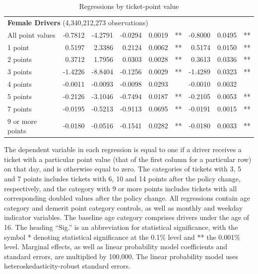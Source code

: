 \documentclass{cje}
\begin{document}
\begin{table}
\begin{tabular}{l r r r r l r r l}
\hline 

\multicolumn{8}{l}{\textbf{Female Drivers} (4,340,212,273 observations)} \\ 

All point values                &  -0.7812        &  -4.2791       &  -0.0294        &  0.0019       &   **       &  -0.8000        &  0.0495       &   **       \\ 
1 point                         &  0.5197        &  2.3386       &  0.2124        &  0.0062       &   **       &  0.5174        &  0.0150       &   **       \\ 
2 points                        &  0.3712        &  1.7956       &  0.0303        &  0.0028       &   **       &  0.3613        &  0.0336       &   **       \\ 
3 points                        &  -1.4226        &  -8.8404       &  -0.1256        &  0.0029       &   **       &  -1.4289        &  0.0323       &   **       \\ 
4 points                        &  -0.0011        &  -0.0093       &  -0.0098        &  0.0293       &            &  -0.0010        &  0.0032       &            \\ 
5 points                        &  -0.2126        &  -3.1046       &  -0.7494        &  0.0187       &   **       &  -0.2105        &  0.0053       &   **       \\ 
7 points                        &  -0.0195        &  -0.5213       &  -0.9113        &  0.0695       &   **       &  -0.0191        &  0.0015       &   **       \\ 
9 or more points                &  -0.0180        &  -0.0516       &  -0.1541        &  0.0282       &   **       &  -0.0180        &  0.0033       &   **       \\ 

\hline 

\end{tabular} 
\caption{Regressions by ticket-point value} 
The dependent variable in each regression is equal to one  
if a driver receives a ticket with a particular point value   
(that of the first column for a particular row) on that day,  
and is otherwise equal to zero. 
The categories of tickets with 3, 5 and 7 points includes tickets  
with 6, 10 and 14 points after the policy change, respectively,  
and the category with 9 or more points includes tickets  
with all corresponding doubled values after the policy change. 
All regressions contain age category and demerit point category controls, 
as well as monthly and weekday indicator variables. 
The baseline age category comprises drivers under the age of 16. 
The heading ``Sig.'' is an abbreviation for statistical significance, with 
the symbol * denoting statistical significance at the 0.1\% level 
and ** the 0.001\% level. 
Marginal effects, as well as linear probability model coefficients and standard errors, are  
multiplied by 100,000.  
The linear probability model uses heteroskedasticity-robust standard errors.  
\label{tab:seas_Logit_vs_LPMx100K_regs_by_points} 
\end{table} 
 
\end{document}
